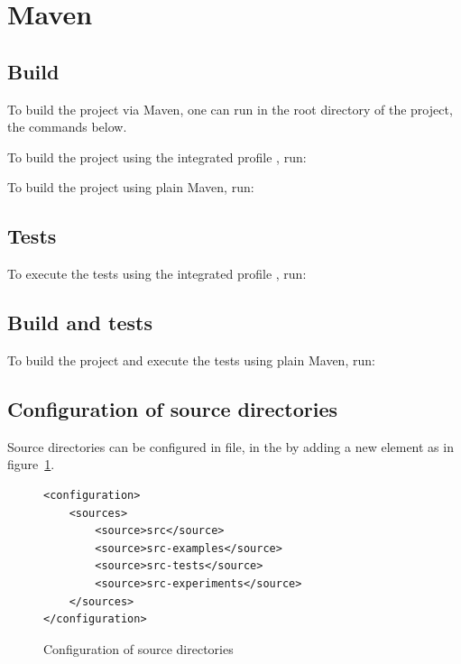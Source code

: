 \documentclass{article}
\begin{document}
\section{Maven}
\clearpage

\subsection{Build}

To build the \fmas project via Maven, one can run in the root directory of the project, the commands below.

To build the project using the integrated profile , run:


To build the project using plain Maven, run:



\subsection{Tests}

To execute the tests using the integrated profile , run:



\subsection{Build and tests}

To build the project and execute the tests using plain Maven, run:


\subsection{Configuration of source directories}

Source directories can be configured in  file, in the  by adding a new element as in figure~\ref{fig:func:source_directories_configuration:code}.

\begin{figure}[ht]\centering
\begin{lstlisting}
<configuration>
    <sources>
        <source>src</source>
        <source>src-examples</source>
        <source>src-tests</source>
        <source>src-experiments</source>
    </sources>
</configuration>
\end{lstlisting}
\caption{Configuration of source directories}\label{fig:func:source_directories_configuration:code}
\end{figure}
\end{document}
